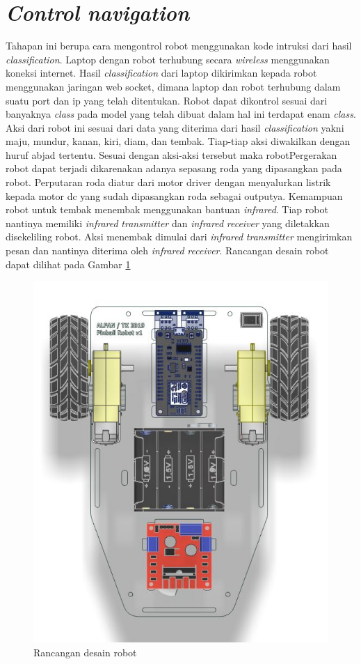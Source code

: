 \section{\emph{Control navigation}} 
Tahapan ini berupa cara mengontrol robot menggunakan kode intruksi dari hasil \emph{classification}. Laptop dengan robot terhubung secara \emph{wireless} menggunakan koneksi internet. Hasil \emph{classification} dari laptop dikirimkan kepada robot menggunakan jaringan web socket, dimana laptop dan robot terhubung dalam suatu port dan ip yang telah ditentukan. Robot dapat dikontrol sesuai dari banyaknya \emph{class} pada model yang telah dibuat dalam hal ini terdapat enam \emph{class}. Aksi dari robot ini sesuai dari data yang diterima dari hasil \emph{classification} yakni maju, mundur, kanan, kiri, diam, dan tembak. Tiap-tiap aksi diwakilkan dengan huruf abjad tertentu. Sesuai dengan aksi-aksi tersebut maka robotPergerakan robot dapat terjadi dikarenakan adanya sepasang roda yang dipasangkan pada robot. Perputaran roda diatur dari motor driver dengan menyalurkan listrik kepada motor dc yang sudah dipasangkan roda sebagai outputya. Kemampuan robot untuk tembak menembak menggunakan bantuan \emph{infrared}. Tiap robot nantinya memiliki \emph{infrared} \emph{transmitter} dan \emph{infrared} \emph{receiver} yang diletakkan disekeliling robot. Aksi menembak dimulai dari \emph{infrared} \emph{transmitter} mengirimkan pesan dan nantinya diterima oleh \emph{infrared} \emph{receiver}. Rancangan desain robot dapat dilihat pada Gambar \ref{fig:rancanganrobot}

\begin{figure}[!h]
  \centering
  \includegraphics[width=0.3\linewidth]{gambar/rancnaganrobot.jpg}
  \caption{Rancangan desain robot}
  \label{fig:rancanganrobot}
\end{figure}
